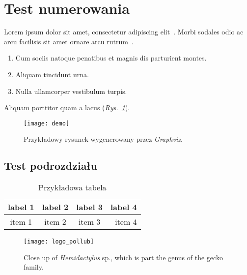 \section{Test numerowania}

Lorem ipsum dolor sit amet, consectetur adipiscing elit~\cite{test1}. Morbi sodales odio ac arcu facilisis sit amet ornare arcu rutrum~\cite{test1,test2}.

\begin{enumerate}
  \item{Cum sociis natoque penatibus et magnis dis parturient montes.}
  \item{Aliquam tincidunt urna.}
  \item{Nulla ullamcorper vestibulum turpis.}
\end{enumerate}

\lipsum[2]

\przyklad \lipsum[12] 

\noindent Aliquam porttitor quam a lacus (\emph{Rys.~\ref{fig:gfx-demo-1}}).


\begin{figure}[h!tb]
  \label{fig:gfx-demo-1}
  \centering
  \texttt{[image: demo]}
  \caption[Przykładowy rysunek]%
  {Przykładowy rysunek wygenerowany przez \emph{Graphviz}.}
\end{figure}

\subsection{Test podrozdziału}

\lipsum[3]

\begin{table}[h!tb]
  \center
  \caption{Przykładowa tabela}
  \label{my_table}
  \begin{tabular}{ | c | c | c | r | }
    \hline
  label 1 & label 2 & label 3 & label 4 \\
  \hline
  item 1  & item 2  & item 3  & item 4  \\
  \hline
  \end{tabular}
\end{table}

\lipsum[4]

\begin{figure}[h!tb]
  \centering
  \texttt{[image: logo\_pollub]}
  \caption[Close up of \textit{Hemidactylus} sp.]%
  {Close up of \textit{Hemidactylus} sp., which is
  part the genus of the gecko family.}
\end{figure}

